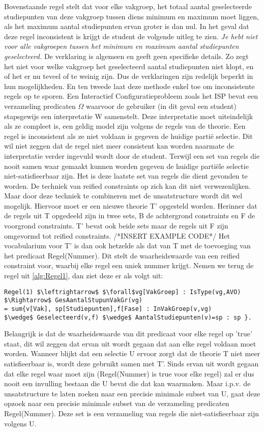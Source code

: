 Bovenstaande regel stelt dat voor elke vakgroep, het totaal aantal geselecteerde studiepunten van deze vakgroep tussen diens minimum en maximum moet liggen, als het maximum aantal studiepunten ervan groter is dan nul. In het geval dat deze regel inconsistent is krijgt de student de volgende uitleg te zien. \emph{Je hebt niet voor alle vakgroepen tussen het minimum en maximum aantal studiepunten geselecteerd.} De verklaring is algemeen en geeft geen specifieke details. Zo zegt het niet voor welke vakgroep het geselecteerd aantal studiepunten niet klopt, en of het er nu teveel of te weinig zijn. Dus de verklaringen zijn redelijk beperkt in hun mogelijkheden. En ten tweede laat deze methode enkel toe om inconsistente regels op te sporen. Een Interactief Configuratieprobleem zoals het ISP bevat een verzameling predicaten $\Omega$ waarvoor de gebruiker (in dit geval een student) stapsgewijs een interpretatie W samenstelt. Deze interpretatie moet uiteindelijk als ze compleet is, een geldig model zijn volgens de regels van de theorie. Een regel is inconsistent als ze niet voldaan is gegeven de huidige parti\"{e} selectie. Dit wil niet zeggen dat de regel niet meer consistent kan worden naarmate de interpretatie verder ingevuld wordt door de student. Terwijl een set van regels die nooit samen waar gemaakt kunnen worden gegeven de huidige parti\"{e}le selectie niet-satisfieerbaar zijn. Het is deze laatste set van regels die dient gevonden te worden. De techniek van reified constraints op zich kan dit niet verwezenlijken. Maar door deze techniek te combineren met de unsatstructure wordt dit wel mogelijk. Hiervoor moet er een nieuwe theorie T' opgesteld worden. Herinner dat de regels uit T opgedeeld zijn in twee sets, B de achtergrond constraints en F de voorgrond constraints. T' bevat ook beide sets maar de regels uit F zijn omgevormd tot reified constraints. 
/*INSERT EXAMPLE CODE*/
Het vocabularium voor T' is dan ook hetzelde als dat van T met de toevoeging van het predicaat Regel(Nummer). Dit stelt de waarheidswaarde van een reified constraint voor, waarbij elke regel een uniek nummer krijgt. Nemen we terug de regel uit \ref{alg:Regel1}, dan ziet deze er als volgt uit: 
\begin{lstlisting}[mathescape, caption=IDP Reified Constraint Example 2, frame=single]
Regel(1) $\leftrightarrow$ $\forall$vg[VakGroep] : IsType(vg,AVO) $\Rightarrow$ GesAantalStupunVakGr(vg) 
= sum{v[Vak], sp[Studiepunten],f[Fase] : InVakGroep(v,vg) 
$\wedge$ Geselecteerd(v,f) $\wedge$ AantalStudiepunten(v)=sp : sp }.
\end{lstlisting}
Belangrijk is dat de waarheidswaarde van dit predicaat voor elke regel op 'true' staat, dit wil zeggen dat ervan uit wordt gegaan dat aan elke regel voldaan moet worden. Wanneer blijkt dat een selectie U ervoor zorgt dat de theorie T niet meer satisfieerbaar is, wordt deze gebruikt samen met T'. Sinds ervan uit wordt gegaan dat elke regel waar moet zijn (Regel(Nummer) is true voor elke regel) zal er dus nooit een invulling bestaan die U bevat die dat kan waarmaken. Maar i.p.v. de unsatstructure te laten zoeken naar een precisie minimale subset van U, gaat deze opzoek naar een precisie minimale subset van de verzameling predicaten Regel(Nummer). Deze set is een verzameling van regels die niet-satisfieerbaar zijn volgens U.

